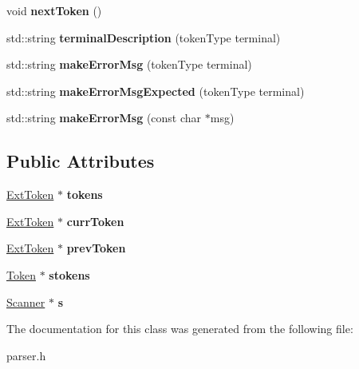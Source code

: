 \begin{DoxyCompactItemize}
\item 
\hypertarget{class_parser_a324a5bb61c9dfc645300a92aecd6fe69}{}void {\bfseries next\+Token} ()\label{class_parser_a324a5bb61c9dfc645300a92aecd6fe69}

\item 
\hypertarget{class_parser_af65b651dfccdd3644c27ec5ae3e82b9d}{}std\+::string {\bfseries terminal\+Description} (token\+Type terminal)\label{class_parser_af65b651dfccdd3644c27ec5ae3e82b9d}

\item 
\hypertarget{class_parser_a72a0ed0baf243132fc4656c89bddc852}{}std\+::string {\bfseries make\+Error\+Msg} (token\+Type terminal)\label{class_parser_a72a0ed0baf243132fc4656c89bddc852}

\item 
\hypertarget{class_parser_a4daf7772e349c22a3eb942021a242167}{}std\+::string {\bfseries make\+Error\+Msg\+Expected} (token\+Type terminal)\label{class_parser_a4daf7772e349c22a3eb942021a242167}

\item 
\hypertarget{class_parser_a17cffdf7846dd5506546b7f9d83d4d36}{}std\+::string {\bfseries make\+Error\+Msg} (const char $\ast$msg)\label{class_parser_a17cffdf7846dd5506546b7f9d83d4d36}

\end{DoxyCompactItemize}
\subsection*{Public Attributes}
\begin{DoxyCompactItemize}
\item 
\hypertarget{class_parser_a3606ff327be18af7f76df95f50851633}{}\hyperlink{class_ext_token}{Ext\+Token} $\ast$ {\bfseries tokens}\label{class_parser_a3606ff327be18af7f76df95f50851633}

\item 
\hypertarget{class_parser_a75ab2e2b9385c14e5f967f873340ed11}{}\hyperlink{class_ext_token}{Ext\+Token} $\ast$ {\bfseries curr\+Token}\label{class_parser_a75ab2e2b9385c14e5f967f873340ed11}

\item 
\hypertarget{class_parser_a4bcf7560a5ea1b486bbe4bb54a5a22eb}{}\hyperlink{class_ext_token}{Ext\+Token} $\ast$ {\bfseries prev\+Token}\label{class_parser_a4bcf7560a5ea1b486bbe4bb54a5a22eb}

\item 
\hypertarget{class_parser_a0910de176dcc1cdfbf7ad99622ce9dd5}{}\hyperlink{class_token}{Token} $\ast$ {\bfseries stokens}\label{class_parser_a0910de176dcc1cdfbf7ad99622ce9dd5}

\item 
\hypertarget{class_parser_ab2ef99ea9e732f5fd176b3949a6c32af}{}\hyperlink{class_scanner}{Scanner} $\ast$ {\bfseries s}\label{class_parser_ab2ef99ea9e732f5fd176b3949a6c32af}

\end{DoxyCompactItemize}


The documentation for this class was generated from the following file\+:\begin{DoxyCompactItemize}
\item 
parser.\+h\end{DoxyCompactItemize}
